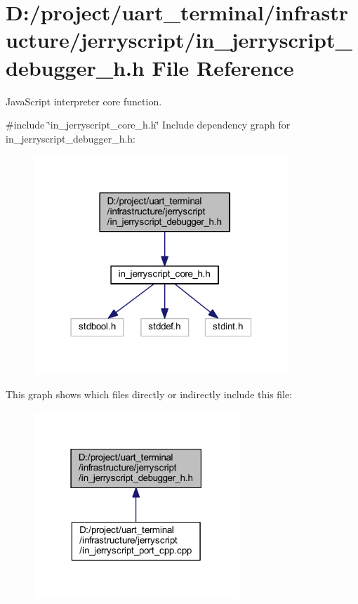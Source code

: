 \section{D\+:/project/uart\+\_\+terminal/infrastructure/jerryscript/in\+\_\+jerryscript\+\_\+debugger\+\_\+h.h File Reference}
\label{in__jerryscript__debugger__h_8h}


Java\+Script interpreter core function.  


{\ttfamily \#include \char`\"{}in\+\_\+jerryscript\+\_\+core\+\_\+h.\+h\char`\"{}}\newline
Include dependency graph for in\+\_\+jerryscript\+\_\+debugger\+\_\+h.\+h\+:
\nopagebreak
\begin{figure}[H]
\begin{center}
\leavevmode
\includegraphics[width=273pt]{in__jerryscript__debugger__h_8h__incl}
\end{center}
\end{figure}
This graph shows which files directly or indirectly include this file\+:
\nopagebreak
\begin{figure}[H]
\begin{center}
\leavevmode
\includegraphics[width=219pt]{in__jerryscript__debugger__h_8h__dep__incl}
\end{center}
\end{figure}
